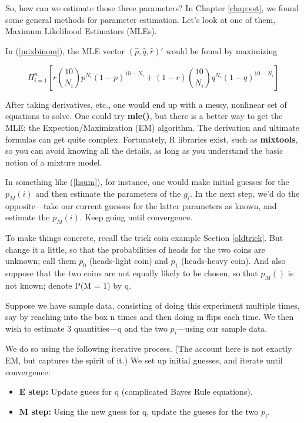 \documentclass[11pt]{article}
\begin{document}
So, how can we estimate those three parameters?  In Chapter
\ref{chap:est}, we found some general methods for parameter estimation.
Let's look at one of them, Maximum Likelihood Estimators (MLEs).

In (\ref{mixbinom}), the MLE vector 
$(\widehat{p},
  \widehat{q},
  \widehat{r})'$
would be found by maximizing

\begin{equation}
\Pi_{i=1}^n
\left [ r \binom{10}{N_i} p^{N_i} (1-p)^{10-N_i} +
(1-r) \binom{10}{N_i} q^{N_i} (1-q)^{10-N_i}
\right ]
\end{equation}

After taking derivatives, etc., one would end up with a messy, nonlinear
set of equations to solve.  One could try {\bf mle()}, but there is a
better way to get the MLE: the Expection/Maximization (EM) algorithm.
The derivation and ultimate formulas can get quite complex.
Fortunately, R libraries exist, such as {\bf mixtools}, so you can avoid
knowing all the details, as long as you understand the basic notion of a
mixture model.  

In something like (\ref{hsum}), for instance, one would make initial
guesses for the $p_M(i)$ and then estimate the parameters of the $g_i$.
In the next step, we'd do the opposite---take our current guesses for
the latter parameters as known, and estimate the $p_M(i)$.  Keep going
until convergence.

To make things concrete, recall the trick coin example Section
\ref{oldtrick}.  But change it a little, so that the probabilities of
heads for the two coins are unknown; call them $p_0$ (heads-light coin)
and $p_1$ (heads-heavy coin).  And also suppose that the two coins are
not equally likely to be chosen, so that $p_M()$ is not known; denote
P(M = 1) by q.

Suppose we have sample data, consisting of doing this experiment
multiple times, say by reaching into the box n times and then doing m
flips each time.  We then wish to estimate 3 quantities---q and the two
$p_i$---using our sample data.  

We do so using the following iterative process.  (The account here is
not exactly EM, but captures the spirit of it.) We set up initial
guesses, and iterate until convergence:

\begin{itemize}

\item {\bf E step:} Update guess for q (complicated Bayes Rule equations).

\item {\bf M step:} Using the new guess for q, update the gueses for the
two $p_i$.

\end{itemize}
\end{document}
